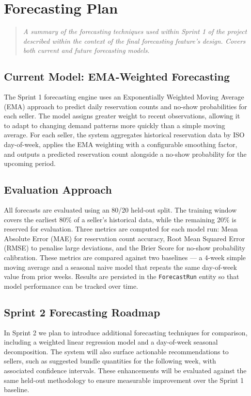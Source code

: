 \documentclass[11pt, a4paper]{report}
\newenvironment{motivation}{\begin{quotation}\noindent\small\itshape}{\end{quotation}}
\begin{document}
	\chapter{Forecasting Plan}
	\begin{motivation}
		A summary of the forecasting techniques used within Sprint 1 of the project described within the context of the final forecasting feature's design. Covers both current and future forecasting models.
	\end{motivation}

	\section{Current Model: EMA-Weighted Forecasting}
	The Sprint 1 forecasting engine uses an Exponentially Weighted Moving Average (EMA) approach to predict daily reservation counts and no-show probabilities for each seller. The model assigns greater weight to recent observations, allowing it to adapt to changing demand patterns more quickly than a simple moving average. For each seller, the system aggregates historical reservation data by ISO day-of-week, applies the EMA weighting with a configurable smoothing factor, and outputs a predicted reservation count alongside a no-show probability for the upcoming period.

	\section{Evaluation Approach}
	All forecasts are evaluated using an 80/20 held-out split. The training window covers the earliest 80\% of a seller's historical data, while the remaining 20\% is reserved for evaluation. Three metrics are computed for each model run: Mean Absolute Error (MAE) for reservation count accuracy, Root Mean Squared Error (RMSE) to penalise large deviations, and the Brier Score for no-show probability calibration. These metrics are compared against two baselines --- a 4-week simple moving average and a seasonal naive model that repeats the same day-of-week value from prior weeks. Results are persisted in the \texttt{ForecastRun} entity so that model performance can be tracked over time.

	\section{Sprint 2 Forecasting Roadmap}
	In Sprint 2 we plan to introduce additional forecasting techniques for comparison, including a weighted linear regression model and a day-of-week seasonal decomposition. The system will also surface actionable recommendations to sellers, such as suggested bundle quantities for the following week, with associated confidence intervals. These enhancements will be evaluated against the same held-out methodology to ensure measurable improvement over the Sprint 1 baseline.
\end{document}
